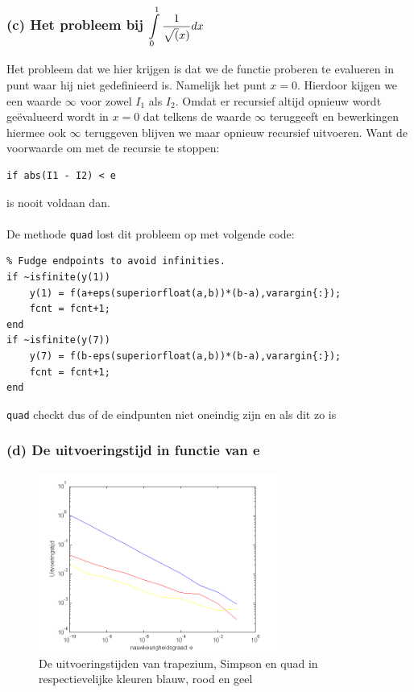\documentclass[11pt,a4paper]{article}
\begin{document}
\subsubsection*{(c) Het probleem bij $\mathop{\mathlarger{\int\limits_{0}^1\frac{1}{\sqrt(x)}dx}}$}
Het probleem dat we hier krijgen is dat we de functie proberen te evalueren in punt waar hij niet gedefinieerd is. Namelijk het punt $x=0$. Hierdoor kijgen we een waarde $\infty$ voor zowel $I_1$ als $I_2$. Omdat er recursief altijd opnieuw wordt ge\"evalueerd wordt in $x=0$ dat telkens de waarde $\infty$ teruggeeft en bewerkingen hiermee ook $\infty$ teruggeven blijven we maar opnieuw recursief uitvoeren. Want de voorwaarde om met de recursie te stoppen: 
\begin{verbatim}
if abs(I1 - I2) < e
\end{verbatim}
is nooit voldaan dan.
\\
\\
De methode \verb|quad| lost dit probleem op met volgende code:
\begin{verbatim}
% Fudge endpoints to avoid infinities.
if ~isfinite(y(1))
    y(1) = f(a+eps(superiorfloat(a,b))*(b-a),varargin{:});
    fcnt = fcnt+1;
end
if ~isfinite(y(7))
    y(7) = f(b-eps(superiorfloat(a,b))*(b-a),varargin{:});
    fcnt = fcnt+1;
end
\end{verbatim}
\verb|quad| checkt dus of de eindpunten niet oneindig zijn en als dit zo is
\subsubsection*{(d) De uitvoeringstijd in functie van e }

\begin{figure}[H]
	\centering
	\includegraphics[width=0.7\textwidth]{12d1.png}
	\caption*{De uitvoeringstijden van trapezium, Simpson en quad in respectievelijke kleuren blauw, rood en geel}
	\end{figure}
\end{document}
